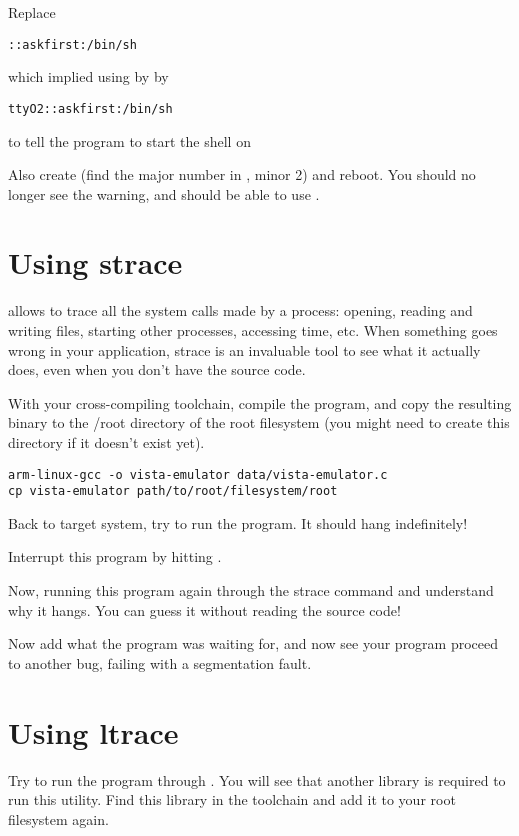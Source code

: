 Replace
\begin{verbatim}
::askfirst:/bin/sh
\end{verbatim}
which implied using  by
by
\begin{verbatim}
ttyO2::askfirst:/bin/sh
\end{verbatim}
to tell the  program to start the shell on 

Also create  (find the major number in
, minor 2) and reboot. You should no longer see
the  warning, and should be able to use
\code{[Ctrl] [C]}.

\section{Using strace}

 allows to trace all the system calls made by a process:
opening, reading and writing files, starting other processes,
accessing time, etc. When something goes wrong in your application,
strace is an invaluable tool to see what it actually does, even when
you don't have the source code.

With your cross-compiling toolchain, compile the
 program, and copy the resulting binary to
the /root directory of the root filesystem (you might need to create
this directory if it doesn't exist yet).

\begin{verbatim}
arm-linux-gcc -o vista-emulator data/vista-emulator.c
cp vista-emulator path/to/root/filesystem/root
\end{verbatim}

Back to target system, try to run the 
program. It should hang indefinitely!

Interrupt this program by hitting \code{[Ctrl] [C]}.

Now, running this program again through the strace command and
understand why it hangs. You can guess it without reading the source
code!

Now add what the program was waiting for, and now see your program
proceed to another bug, failing with a segmentation fault.

\section{Using ltrace}

Try to run the program through . You will see that
another library is required to run this utility. Find this library in
the toolchain and add it to your root filesystem again.

